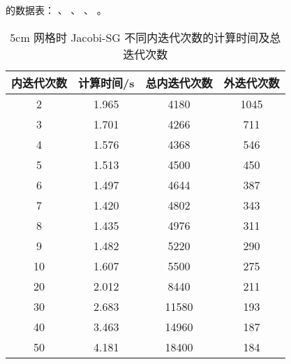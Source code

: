 \begin{datasheet}
的数据表：
、
、
、
。

\begin{table}
\centering
\caption{5cm 网格时 Jacobi-SG 不同内迭代次数的计算时间及总迭代次数}
\label{tab:equsolve.iter.jacobi-sg.5cm}
\begin{tabular}{cccc}
\toprule
内迭代次数 & 计算时间/s & 总内迭代次数 & 外迭代次数\\
\midrule
2 & 1.965 & 4180 & 1045\\
3 & 1.701 & 4266 & 711\\
4 & 1.576 & 4368 & 546\\
5 & 1.513 & 4500 & 450\\
6 & 1.497 & 4644 & 387\\
7 & 1.420 & 4802 & 343\\
8 & 1.435 & 4976 & 311\\
9 & 1.482 & 5220 & 290\\
10 & 1.607 & 5500 & 275\\
20 & 2.012 & 8440 & 211\\
30 & 2.683 & 11580 & 193\\
40 & 3.463 & 14960 & 187\\
50 & 4.181 & 18400 & 184\\
\bottomrule
\end{tabular}
\end{table}


\end{datasheet}
